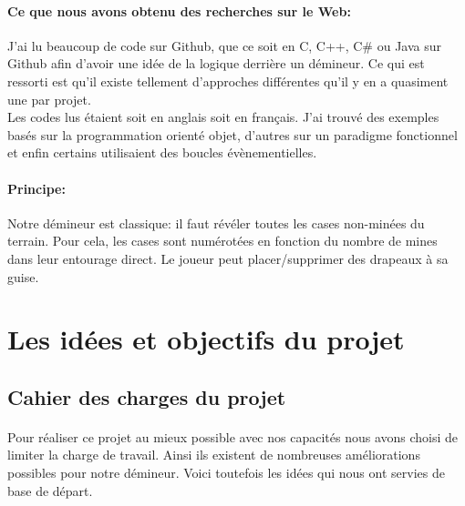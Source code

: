 \documentclass[12pt, a4paper]{article}
\begin{document}
\paragraph{Ce que nous avons obtenu des recherches sur le Web:}
J'ai lu beaucoup de code sur Github, que ce soit en C, C++, C\# ou Java sur
Github afin d'avoir une idée de la logique derrière un démineur. Ce qui est
ressorti est qu'il existe tellement d'approches différentes qu'il y en a
quasiment une par projet. \\
Les codes lus étaient soit en anglais soit en français. J'ai trouvé des
exemples basés sur la programmation orienté objet, d'autres sur un paradigme
fonctionnel et enfin certains utilisaient des boucles évènementielles.

\paragraph{Principe:}
Notre démineur est classique: il faut révéler toutes les cases non-minées du
terrain. Pour cela, les cases sont numérotées en fonction du nombre de mines
dans leur entourage direct. Le joueur peut placer/supprimer des drapeaux à sa
guise.


\newpage

\section{Les idées et objectifs du projet}

\subsection{Cahier des charges du projet}

\paragraph{}
Pour réaliser ce projet au mieux possible avec nos capacités nous avons choisi
de limiter la charge de travail. Ainsi ils existent de nombreuses améliorations
possibles pour notre démineur. Voici toutefois les idées qui nous ont servies
de base de départ.

\paragraph{}
\end{document}
